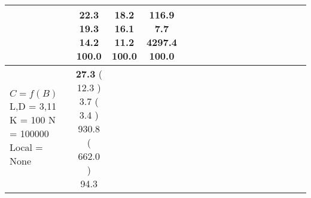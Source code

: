 \documentclass[9pt]{article}
\begin{document}
\begin{landscape}
\begin{longtable}{ l | c c c c | c c c c | c c c c | c c c c |}
             &
                            \makecell{              22.3
     \\
            {\footnotesize             19.3
    } \\  {\footnotesize             14.2
     } \\
            {\small \textcolor[rgb]{ 0.2 , 0.7 , 0.1} {100.0  }
} }
             &                         \makecell{              18.2
     \\
            {\footnotesize             16.1
    } \\  {\footnotesize             11.2
     } \\
            {\small \textcolor[rgb]{ 0.2 , 0.7 , 0.1} {100.0  }
} }
             &
                            \makecell{              116.9
     \\
            {\footnotesize             7.7
    } \\  {\footnotesize             4297.4
     } \\
            {\small \textcolor[rgb]{ 0.2 , 0.7 , 0.1} {100.0  }
} }
            

 \\
                                                            
                    \hline
                    \makecell{ \textbf{ $ C = f(B) $} \\
                    { \small L,D = 3,11} \\
                    {\small K = 100} \\
                    {\small N = 100000 } \\ {\small Local = None }} &
                    
                            \makecell{              \textbf{ 27.3 }
     (             12.3
    ) \\
            {\footnotesize             3.7
     (              3.4
     )} \\
            {\footnotesize             930.8
     (            662.0
    ) } \\
            {\small  \textcolor[rgb]{ 0.314 , 0.586 , 0.1} {94.3  }
} }



\end{longtable}
\end{landscape}
\end{document}
